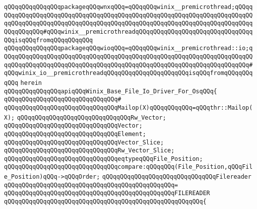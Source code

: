 \verb|qQQqqQQqqQQqqQQqpackageqQQqwnxqQQq=qQQqqQQqwinix__premicrothread;qQQqqQQqqQQqqQQqqQQqqQQqqQQqqQQqqQQqqQQqqQQqqQQqqQQqqQQqqQQqqQQqqQQqqQQqqQQqqQQqqQQqqQQqqQQqqQQqqQQqqQQqqQQqqQQqqQQqqQQqqQQqqQQqqQQqqQQqqQQqqQQqqQQqqQQqqQQq#qQQqwinix__premicrothreadqQQqqQQqqQQqqQQqqQQqqQQqqQQqqQQqqQQqisqQQqfromqQQqqQQqqQQq|\newline
\verb|qQQqqQQqqQQqqQQqpackageqQQqwioqQQq=qQQqqQQqwinix__premicrothread::io;qQQqqQQqqQQqqQQqqQQqqQQqqQQqqQQqqQQqqQQqqQQqqQQqqQQqqQQqqQQqqQQqqQQqqQQqqQQqqQQqqQQqqQQqqQQqqQQqqQQqqQQqqQQqqQQqqQQqqQQqqQQqqQQqqQQqqQQqqQQq#qQQqwinix_io__premicrothreadqQQqqQQqqQQqqQQqqQQqqQQqisqQQqfromqQQqqQQqqQQq|\newline
\verb|herein|\newline
\newline
\verb|qQQqqQQqqQQqqQQqapiqQQqWinix_Base_File_Io_Driver_For_OsqQQq{|\newline
\verb|qQQqqQQqqQQqqQQqqQQqqQQqqQQqqQQq#|\newline
\verb|qQQqqQQqqQQqqQQqqQQqqQQqqQQqqQQqMailop(X)qQQqqQQqqQQq=qQQqthr::Mailop(X);|\newline
\newline
\verb|qQQqqQQqqQQqqQQqqQQqqQQqqQQqqQQqRw_Vector;|\newline
\verb|qQQqqQQqqQQqqQQqqQQqqQQqqQQqqQQqVector;|\newline
\verb|qQQqqQQqqQQqqQQqqQQqqQQqqQQqqQQqElement;|\newline
\verb|qQQqqQQqqQQqqQQqqQQqqQQqqQQqqQQqVector_Slice;|\newline
\verb|qQQqqQQqqQQqqQQqqQQqqQQqqQQqqQQqRw_Vector_Slice;|\newline
\verb|qQQqqQQqqQQqqQQqqQQqqQQqqQQqqQQqeqtypeqQQqFile_Position;|\newline
\newline
\verb|qQQqqQQqqQQqqQQqqQQqqQQqqQQqqQQqcompare:qQQqqQQq(File_Position,qQQqFile_Position)qQQq->qQQqOrder;|\newline
\newline
\verb|qQQqqQQqqQQqqQQqqQQqqQQqqQQqqQQqFilereader|\newline
\verb|qQQqqQQqqQQqqQQqqQQqqQQqqQQqqQQqqQQqqQQqqQQqqQQq=|\newline
\verb|qQQqqQQqqQQqqQQqqQQqqQQqqQQqqQQqqQQqqQQqqQQqqQQqFILEREADER|\newline
\verb|qQQqqQQqqQQqqQQqqQQqqQQqqQQqqQQqqQQqqQQqqQQqqQQqqQQqqQQq{|\newline
